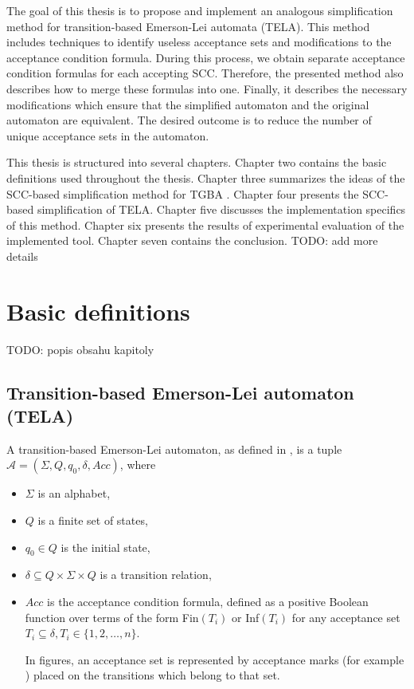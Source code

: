 \documentclass[
  digital, %
  twoside, %
  table,   %
  lof,     %
  lot,     %
]{fithesis3}
\begin{document}
The goal of this thesis is to propose and implement an analogous simplification method for transition-based Emerson-Lei automata (TELA). This method includes techniques to identify useless acceptance sets and modifications to the acceptance condition formula. During this process, we obtain separate acceptance condition formulas for each accepting SCC. Therefore, the presented method also describes how to merge these formulas into one. Finally, it describes the necessary modifications which ensure that the simplified automaton and the original automaton are equivalent. The desired outcome is to reduce the number of unique acceptance sets in the automaton. 

This thesis is structured into several chapters. Chapter two contains the basic definitions used throughout the thesis. Chapter three summarizes the ideas of the SCC-based simplification method for TGBA \cite{spin2013}. Chapter four presents the SCC-based simplification of TELA. Chapter five discusses the implementation specifics of this method. Chapter six presents the results of experimental evaluation of the implemented tool. Chapter seven contains the conclusion. TODO: add more details

\chapter{Basic definitions}
\label{chap:basic_definitions}
TODO: popis obsahu kapitoly

\section{Transition-based Emerson-Lei automaton (TELA)} 
\label{sec:tela}
A transition-based Emerson-Lei automaton, as defined in \cite{bloemen2017}, is a tuple $\mathcal{A} = (\Sigma, Q, q_0, \delta, Acc)$, where
\begin{itemize}
  \item $\Sigma$ is an alphabet,
  \item $Q$ is a finite set of states,
  \item $q_0 \in Q$ is the initial state,
  \item $\delta \subseteq Q \times \Sigma \times Q$ is a transition relation,
  \item $Acc$ is the acceptance condition formula, defined as a positive Boolean function over terms of the form Fin$(T_i)$ or Inf$(T_i)$ for any acceptance set $T_i \subseteq \delta, T_i \in \{1, 2, \dots, n\}$. 
  
  In figures, an acceptance set is represented by acceptance marks (for example \accmarkblue) placed on the transitions which belong to that set. 
\end{itemize}
\end{document}
